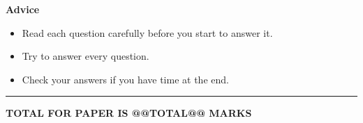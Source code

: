 \documentclass[a4paper,12pt]{article}
\begin{document}
{{\begin{adjustwidth}{1.5cm}{1.5cm}
  \vspace{0.5em} 
  {\large\bfseries Advice\par}
  \begin{itemize}[%
      left=1em,
      label=\textbullet,
      topsep=0pt, 
      partopsep=0pt,
      parsep=0pt, 
      itemsep=0pt
    ]
    \item Read each question carefully before you start to answer it.
    \item Try to answer every question.
    \item Check your answers if you have time at the end.
  \end{itemize}
\end{adjustwidth}
}
}%



\vspace{1ex}

\hrule height 1pt

\vspace{1ex}

\hfill \textbf{TOTAL FOR PAPER IS @@TOTAL@@ MARKS}
\end{document}
